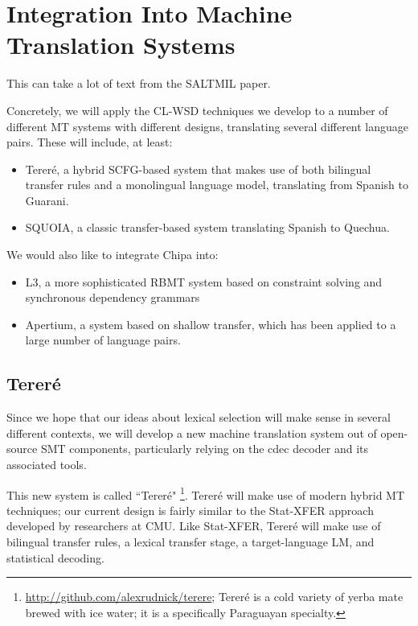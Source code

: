 \chapter{Integration Into Machine Translation Systems}
\label{chap:integration}

This can take a lot of text from the SALTMIL paper.


Concretely, we will apply the CL-WSD techniques we develop to a number of
different MT systems with different designs, translating several different
language pairs.  These will include, at least:
\begin{itemize}
\item Tereré, a hybrid SCFG-based system that makes use of both bilingual
transfer rules and a monolingual language model, translating from Spanish to
Guarani.
\item SQUOIA, a classic transfer-based system translating Spanish to Quechua.
\end{itemize}

We would also like to integrate Chipa into:

\begin{itemize}
\item L3, a more sophisticated RBMT system based on constraint solving and
synchronous dependency grammars 
\item Apertium, a system based on shallow transfer, which has been
applied to a large number of language pairs.
\end{itemize}


\section{Tereré}
Since we hope that our ideas about lexical selection will make sense in several
different contexts, we will develop a new machine translation system out of
open-source SMT components, particularly relying on the cdec decoder and its
associated tools.
\cite{dyer-EtAl:2010:Demos}


This new system is called ``Tereré"
\footnote{\url{http://github.com/alexrudnick/terere}; 
Tereré is a cold variety of yerba mate brewed with ice water; it is a
specifically Paraguayan specialty.}.
Tereré will make use of modern hybrid MT techniques; our current design is
fairly similar to the Stat-XFER approach \cite{DBLP:conf/cicling/Lavie08}
developed by researchers at CMU.
Like Stat-XFER, Tereré will make use of bilingual transfer rules, a lexical
transfer stage, a target-language LM, and statistical decoding.

